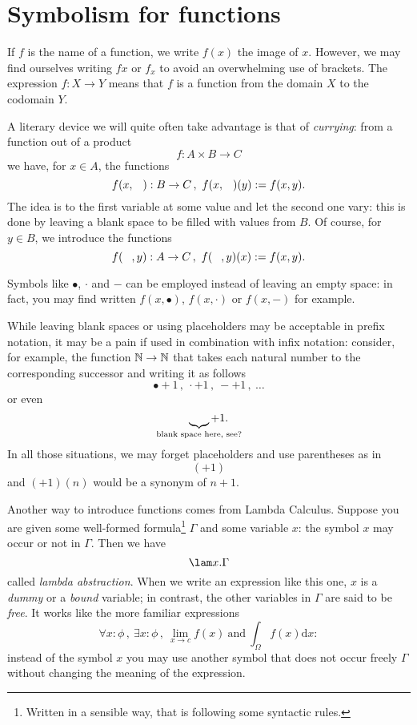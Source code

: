 
\section{Symbolism for functions}

If \(f\) is the name of a function, we write \(f(x)\) the image of \(x\). However, we may find ourselves writing \(fx\) or \(f_x\) to avoid an overwhelming use of brackets. The expression \(f : X \to Y\) means that \(f\) is a function from the domain \(X\) to the codomain \(Y\).

A literary device we will quite often take advantage is that of {\em currying}: from a function out of a product
\[f : A \times B \to C\]
we have, for \(x \in A\), the functions
\[f(x, \hole) : B \to C\,, \ f(x,\hole) (y) := f(x, y) .\]
The idea is to  the first variable at some value and let the second one vary: this is done by leaving a blank space to be filled with values from \(B\). Of course, for \(y \in B\), we introduce the functions
\[f(\hole, y) : A \to C\,, \ f(\hole,y) (x) := f(x, y) .\]

Symbols like \(\bullet\), \(\cdot\) and \(-\) can be employed instead of leaving an empty space: in fact, you may find written \(f(x, \bullet)\), \(f(x, \cdot)\) or \(f(x, -)\) for example.

While leaving blank spaces or using placeholders may be acceptable in prefix notation, it may be a pain if used in combination with infix notation: consider, for example, the function \(\mathbb N \to \mathbb N\) that takes each natural number to the corresponding successor and writing it as follows
\[\bullet + 1 \,,\ \cdot + 1 \,,\ - + 1 \,,\ \dots{}\]
or even
\[\underbrace{\hole}_{\mathclap{\text{blank space here, see?}}} + 1 .\]
In all those situations, we may forget placeholders and use parentheses as in
\[(+1)\]
and \((+1)(n)\) would be a synonym of \(n+1\).

Another way to introduce functions comes from Lambda Calculus. Suppose you are given some well-formed formula\footnote{Written in a sensible way, that is following some syntactic rules. } \(\Gamma\) and some variable \(x\): the symbol \(x\) may occur or not in \(\Gamma\). Then we have
\[\lam x . \Gamma\]
called {\em lambda abstraction}. When we write an expression like this one, \(x\) is a {\em dummy} or a {\em bound} variable; in contrast, the other variables in \(\Gamma\) are said to be {\em free}. It works like the more familiar expressions
\[\forall x : \phi\,,\ \exists x : \phi\,,\ \displaystyle \lim_{x \to c} f(x)\ \text{and} \ \displaystyle \int_\Omega f(x) \mathrm d x :\]
instead of the symbol \(x\) you may use another symbol that does not occur freely \(\Gamma\) without changing the meaning of the expression.

